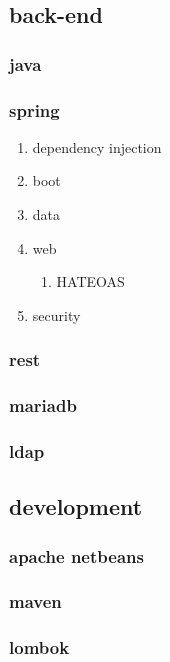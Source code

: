 \documentclass[11pt]{article}
\begin{document}
\subsection{back-end}
\label{sec:orge072ac1}
\subsubsection{java}
\label{sec:org97f0174}
\subsubsection{spring}
\label{sec:org1c9bcea}
\begin{enumerate}
\item dependency injection
\label{sec:org710303f}
\item boot
\label{sec:org34323f1}
\item data
\label{sec:org85b39c6}
\item web
\label{sec:org50a6b03}
\begin{enumerate}
\item HATEOAS
\label{sec:org4fefa89}
\end{enumerate}
\item security
\label{sec:org97b552d}
\end{enumerate}
\subsubsection{rest}
\label{sec:org74f8f0b}
\subsubsection{mariadb}
\label{sec:orgcab1a87}
\subsubsection{ldap}
\label{sec:orgeda7d76}
\subsection{development}
\label{sec:org58c8a3c}
\subsubsection{apache netbeans}
\label{sec:org61fff4c}
\subsubsection{maven}
\label{sec:orgc3b9665}
\subsubsection{lombok}
\label{sec:org0d986e6}
\end{document}

